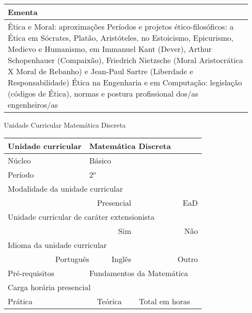 \begin{quadro}[h!]
\begin{tabular}{|p{3cm} p{2cm} p{3cm} p{2cm} p{3cm} p{2cm}|}
\multicolumn{6}{|p{15cm}|}{\cellcolor{blue1} Ementa} \\\hline
\hline\multicolumn{6}{|p{15cm}|}{\scriptsize Ética e Moral: aproximações Períodos e projetos ético-filosóficos: a Ética em Sócrates, Platão, Aristóteles, no Estoicismo, Epicurismo, Medievo e Humanismo, em Immanuel Kant (Dever), Arthur Schopenhauer (Compaixão), Friedrich Nietzsche (Moral Aristocrática X Moral de Rebanho) e Jean-Paul Sartre (Liberdade e Responsabilidade) Ética na Engenharia e em Computação: legislação (códigos de Ética), normas e postura profissional dos/as engenheiros/as}\\\hline
\hline
	\end{tabular}
\end{quadro}
\begin{quadro}[h!]
  \centering\scriptsize
\caption{Unidade Curricular Matemática Discreta}
\label{ unit_11 }
\begin{tabular}{|p{3cm} p{2cm} p{3cm} p{2cm} p{3cm} p{2cm}|}\hline
\multicolumn{1}{|p{3cm}|}{\cellcolor{blue1} Unidade curricular} & \multicolumn{5}{p{9cm}|}{ Matemática Discreta }\\\hline
\multicolumn{1}{|p{3cm}|}{\cellcolor{blue1} Núcleo} & \multicolumn{5}{p{11.5cm}|}{ Básico }\\\hline
\multicolumn{1}{|p{3cm}|}{\cellcolor{blue1} Período} & \multicolumn{5}{p{9cm}|}{ 2$^o$ }\\\hline
\multicolumn{6}{|p{15cm}|}{\cellcolor{blue1} Modalidade da unidade curricular} \\\hline
\multicolumn{2}{|r}{		} &  \multicolumn{2}{r}{Presencial \XBox } & \multicolumn{2}{r|}{EaD \Square	} \\\hline
\multicolumn{6}{|p{15cm}|}{\cellcolor{blue1} Unidade curricular de caráter extensionista} \\\hline
\multicolumn{4}{|r}{			Sim \Square	} & \multicolumn{2}{r|}{	Não \XBox	}\\\hline
\multicolumn{6}{|p{15cm}|}{\cellcolor{blue1} Idioma da unidade curricular} \\ \hline
\multicolumn{2}{|r}{	Português \XBox	} &  \multicolumn{2}{r}{	Inglês \Square	} & \multicolumn{2}{r|}{	Outro \Square	} \\ \hline
\multicolumn{1}{|p{3cm}|}{\cellcolor{blue1} Pré-requisitos} & \multicolumn{5}{p{9cm}|}{ Fundamentos da Matemática }\\ \hline
\multicolumn{6}{|p{15cm}|}{\cellcolor{blue1} Carga horária presencial} \\ \hline
\multicolumn{1}{|p{3cm}|}{\raggedleft Prática} & \multicolumn{1}{p{1cm}|}{\centering	30	} &  \multicolumn{1}{p{3cm}|}{\raggedleft Teórica}  & \multicolumn{1}{p{1cm}|}{\centering 	30 } & \multicolumn{1}{p{3cm}|}{\raggedleft Total em horas} & \multicolumn{1}{p{1cm}|}{\raggedleft	60	} \\ \hline

\end{tabular}
\end{quadro}
